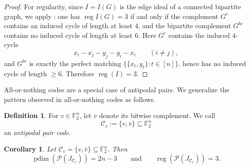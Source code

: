 \documentclass[12pt]{amsart}
\newtheorem{corollary}[theorem]{Corollary}
\theoremstyle{remark}
\theoremstyle{definition}
\newtheorem{definition}[theorem]{Definition}
\DeclareMathOperator{\reg}{reg}
\DeclareMathOperator{\pd}{pdim}
\newcommand{\F}{\mathbb{F}}
\newcommand{\C}{\mathcal{C}}
\def\P{{\mathcal P}}
\begin{document}
\begin{proof}
For regularity, since $I=I(G)$ is the edge ideal of a connected bipartite graph, we apply
\cite[Theorem~3.1]{fernándezramos}: one has $\reg I(G)=3$ if and only if the complement $G^c$ contains an
induced cycle of length at least $4$, and the bipartite complement $G^{bc}$ contains no induced cycle of
length at least $6$. Here $G^c$ contains the induced $4$-cycle
\[
x_i - x_j - y_j - y_i - x_i \qquad (i\neq j),
\]
and $G^{bc}$ is exactly the perfect matching $\{\{x_t,y_t\}:t\in[n]\}$, hence has no induced cycle of
length $\ge 6$. Therefore $\reg(I)=3$.
\end{proof}




All-or-nothing codes are a special case of antipodal pairs. We generalize the pattern observed in all-or-nothing codes as follows.

\begin{definition}\label{def:antipodal_pair}
For $v\in \F_2^n$, let $\overline v$ denote its bitwise complement.
We call
\[
\C_v  :=  \{v,\overline v\}\subseteq \F_2^n
\]
an \emph{antipodal pair code}.
\end{definition}


\begin{corollary}\label{cor:antipodal_pairs_maxpdim}
Let $\C_v=\{v,\bar v\}\subseteq\F_2^n$. Then
\[
\pd(\P(J_{\C_v}))=2n-3
\qquad\text{and}\qquad
\reg(\P(J_{\C_v}))=3.
\]
\end{corollary}
\end{document}
